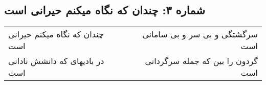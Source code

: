 \begin{center}
\section*{شماره ۳: چندان که نگاه میکنم حیرانی است}
\label{sec:003}
\begin{longtable}{l p{0.5cm} r}
چندان که نگاه میکنم حیرانی است
&&
سرگشتگی و بی سر و بی سامانی است
\\
در بادیهای که دانشش نادانی است
&&
گردون را بین که جمله سرگردانی است
\\
\end{longtable}
\end{center}
